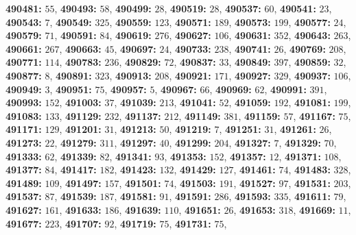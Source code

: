 \textsf{\bfseries 490481:} $55$, \textsf{\bfseries 490493:} $58$, \textsf{\bfseries 490499:} $28$, \textsf{\bfseries 490519:} $28$, \textsf{\bfseries 490537:} $60$, \textsf{\bfseries 490541:} $23$, \textsf{\bfseries 490543:} $7$, \textsf{\bfseries 490549:} $325$, \textsf{\bfseries 490559:} $123$, \textsf{\bfseries 490571:} $189$, \textsf{\bfseries 490573:} $199$, \textsf{\bfseries 490577:} $24$, \textsf{\bfseries 490579:} $71$, \textsf{\bfseries 490591:} $84$, \textsf{\bfseries 490619:} $276$, \textsf{\bfseries 490627:} $106$, \textsf{\bfseries 490631:} $352$, \textsf{\bfseries 490643:} $263$, \textsf{\bfseries 490661:} $267$, \textsf{\bfseries 490663:} $45$, \textsf{\bfseries 490697:} $24$, \textsf{\bfseries 490733:} $238$, \textsf{\bfseries 490741:} $26$, \textsf{\bfseries 490769:} $208$, \textsf{\bfseries 490771:} $114$, \textsf{\bfseries 490783:} $236$, \textsf{\bfseries 490829:} $72$, \textsf{\bfseries 490837:} $33$, \textsf{\bfseries 490849:} $397$, \textsf{\bfseries 490859:} $32$, \textsf{\bfseries 490877:} $8$, \textsf{\bfseries 490891:} $323$, \textsf{\bfseries 490913:} $208$, \textsf{\bfseries 490921:} $171$, \textsf{\bfseries 490927:} $329$, \textsf{\bfseries 490937:} $106$, \textsf{\bfseries 490949:} $3$, \textsf{\bfseries 490951:} $75$, \textsf{\bfseries 490957:} $5$, \textsf{\bfseries 490967:} $66$, \textsf{\bfseries 490969:} $62$, \textsf{\bfseries 490991:} $391$, \textsf{\bfseries 490993:} $152$, \textsf{\bfseries 491003:} $37$, \textsf{\bfseries 491039:} $213$, \textsf{\bfseries 491041:} $52$, \textsf{\bfseries 491059:} $192$, \textsf{\bfseries 491081:} $199$, \textsf{\bfseries 491083:} $133$, \textsf{\bfseries 491129:} $232$, \textsf{\bfseries 491137:} $212$, \textsf{\bfseries 491149:} $381$, \textsf{\bfseries 491159:} $57$, \textsf{\bfseries 491167:} $75$, \textsf{\bfseries 491171:} $129$, \textsf{\bfseries 491201:} $31$, \textsf{\bfseries 491213:} $50$, \textsf{\bfseries 491219:} $7$, \textsf{\bfseries 491251:} $31$, \textsf{\bfseries 491261:} $26$, \textsf{\bfseries 491273:} $22$, \textsf{\bfseries 491279:} $311$, \textsf{\bfseries 491297:} $40$, \textsf{\bfseries 491299:} $204$, \textsf{\bfseries 491327:} $7$, \textsf{\bfseries 491329:} $70$, \textsf{\bfseries 491333:} $62$, \textsf{\bfseries 491339:} $82$, \textsf{\bfseries 491341:} $93$, \textsf{\bfseries 491353:} $152$, \textsf{\bfseries 491357:} $12$, \textsf{\bfseries 491371:} $108$, \textsf{\bfseries 491377:} $84$, \textsf{\bfseries 491417:} $182$, \textsf{\bfseries 491423:} $132$, \textsf{\bfseries 491429:} $127$, \textsf{\bfseries 491461:} $74$, \textsf{\bfseries 491483:} $328$, \textsf{\bfseries 491489:} $109$, \textsf{\bfseries 491497:} $157$, \textsf{\bfseries 491501:} $74$, \textsf{\bfseries 491503:} $191$, \textsf{\bfseries 491527:} $97$, \textsf{\bfseries 491531:} $203$, \textsf{\bfseries 491537:} $87$, \textsf{\bfseries 491539:} $187$, \textsf{\bfseries 491581:} $91$, \textsf{\bfseries 491591:} $286$, \textsf{\bfseries 491593:} $335$, \textsf{\bfseries 491611:} $79$, \textsf{\bfseries 491627:} $161$, \textsf{\bfseries 491633:} $186$, \textsf{\bfseries 491639:} $110$, \textsf{\bfseries 491651:} $26$, \textsf{\bfseries 491653:} $318$, \textsf{\bfseries 491669:} $11$, \textsf{\bfseries 491677:} $223$, \textsf{\bfseries 491707:} $92$, \textsf{\bfseries 491719:} $75$, \textsf{\bfseries 491731:} $75$, 
